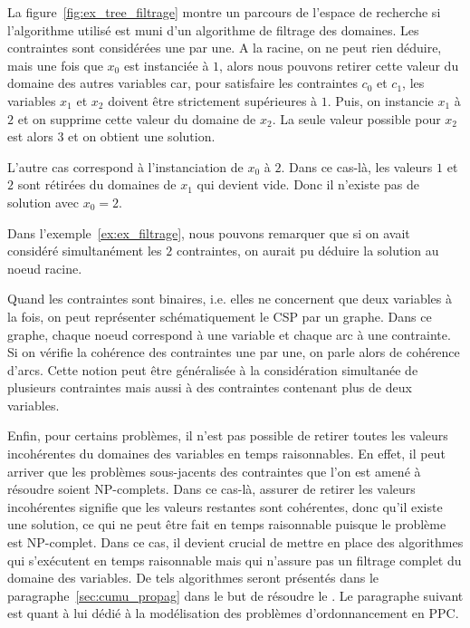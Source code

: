 \begin{ex}
La figure~\ref{fig:ex_tree_filtrage} montre un parcours de l'espace de
recherche si l'algorithme utilisé est muni d'un algorithme de filtrage
des domaines. Les contraintes sont considérées une par une.  A
la racine, on ne peut rien déduire, mais une fois que $x_0$ est
instanciée à $1$, alors nous pouvons retirer cette valeur du domaine
des autres variables car, pour satisfaire les contraintes $c_0$ et
$c_1$, les variables $x_1$ et $x_2$ doivent être strictement
supérieures à $1$. Puis, on instancie $x_1$ à $2$ et on supprime cette
valeur du domaine de $x_2$. La seule valeur possible pour $x_2$ est
alors $3$ et on obtient une solution.

L'autre cas correspond à l'instanciation de $x_0$ à $2$. Dans ce
cas-là, les valeurs $1$ et $2$ sont rétirées du domaines de $x_1$ qui
devient vide. Donc il n'existe pas de solution avec $x_0=2$.
\end{ex}

Dans l'exemple~\ref{ex:ex_filtrage}, nous pouvons remarquer que si on
avait considéré simultanément les $2$ contraintes, on
aurait pu déduire la solution au noeud racine. 

Quand les contraintes sont binaires, i.e. elles ne concernent que deux
variables à la fois, on peut représenter schématiquement le CSP par un
graphe. Dans ce graphe, chaque noeud correspond à une variable et
chaque arc à une contrainte. Si on vérifie la cohérence des
contraintes une par une, on parle alors de cohérence d'arcs. Cette
notion peut être généralisée à la considération simultanée de
plusieurs contraintes mais aussi à des contraintes contenant plus de
deux variables.

Enfin, pour certains problèmes, il n'est pas possible de retirer
toutes les valeurs incohérentes du domaines des variables en temps
raisonnables. En effet, il peut arriver que les problèmes sous-jacents
des contraintes que l'on est amené à résoudre soient NP-complets. Dans
ce cas-là, assurer de retirer les valeurs incohérentes signifie que
les valeurs restantes sont cohérentes, donc qu'il existe une
solution, ce qui ne peut être fait en temps raisonnable puisque le
problème est NP-complet.  Dans ce cas, il devient crucial de mettre
en place des algorithmes qui s'exécutent en temps raisonnable mais qui
n'assure pas un filtrage complet du domaine des variables. De tels
algorithmes seront présentés dans le paragraphe~\ref{sec:cumu_propag}
dans le but de résoudre le \CUSP. Le paragraphe suivant est quant à
lui dédié à la modélisation des problèmes d'ordonnancement en PPC.